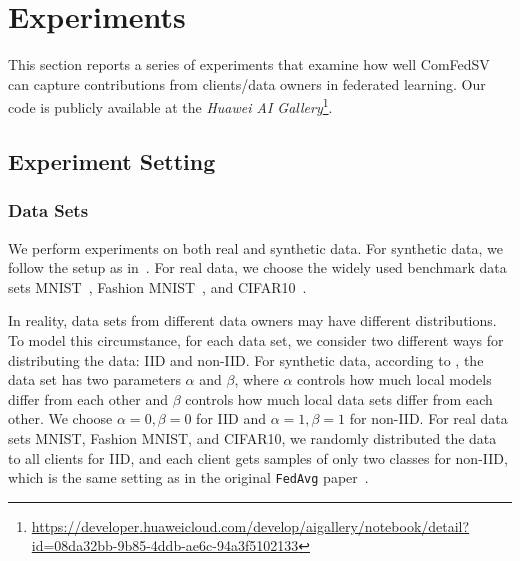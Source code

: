 \section{Experiments} \label{sec:7.6}
This section reports a series of experiments that examine how well ComFedSV can capture contributions from clients/data owners in federated learning. Our code is publicly available at the \emph{Huawei AI Gallery}\footnote{\url{https://developer.huaweicloud.com/develop/aigallery/notebook/detail?id=08da32bb-9b85-4ddb-ae6c-94a3f5102133}}.

\subsection{Experiment Setting} \label{sec:7.6.1}

\subsubsection{Data Sets} 
We perform experiments on both real and synthetic data. For synthetic data, we follow the setup as in~\cite{li2018federated}. For real data, we choose the widely used benchmark data sets MNIST~\cite{lecun-mnisthandwrittendigit-2010}, Fashion MNIST~\cite{xiao2017fashion}, and CIFAR10~\cite{krizhevsky2009learning}.  

In reality, data sets from different data owners may have different distributions. To model this circumstance, for each data set, we consider two different ways for distributing the data: IID and non-IID. For synthetic data, according to \cite{li2018federated}, the data set has two parameters $\alpha$ and $\beta$, where $\alpha$ controls how much local models differ from each other and $\beta$ controls how much local data sets differ from each other. We choose $\alpha=0, \beta=0$ for IID and $\alpha=1, \beta=1$ for non-IID. For real data sets MNIST, Fashion MNIST, and CIFAR10, we randomly distributed the data to all clients for IID, and each client gets samples of only two classes for non-IID, which is the same setting as in the original \texttt{FedAvg} paper~\cite{mcmahan2017communication}.


